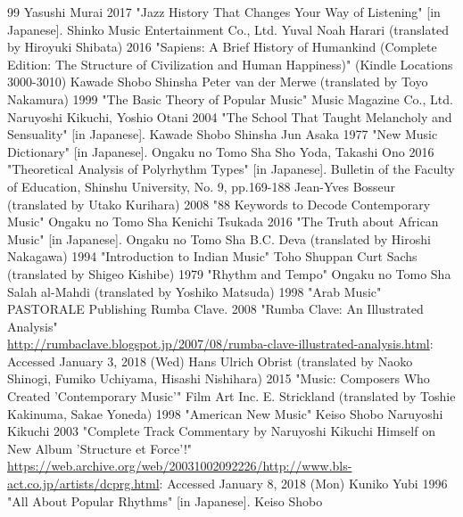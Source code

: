 
\begin{thebibliography}{99}
 Yasushi Murai 2017 "Jazz History That Changes Your Way of Listening" [in Japanese]. Shinko Music Entertainment Co., Ltd.
 Yuval Noah Harari (translated by Hiroyuki Shibata) 2016 "Sapiens: A Brief History of Humankind (Complete Edition: The Structure of Civilization and Human Happiness)" (Kindle Locations 3000-3010) Kawade Shobo Shinsha
 Peter van der Merwe (translated by Toyo Nakamura) 1999 "The Basic Theory of Popular Music" Music Magazine Co., Ltd.
 Naruyoshi Kikuchi, Yoshio Otani 2004 "The School That Taught Melancholy and Sensuality" [in Japanese]. Kawade Shobo Shinsha
 Jun Asaka 1977 "New Music Dictionary" [in Japanese]. Ongaku no Tomo Sha
 Sho Yoda, Takashi Ono 2016 "Theoretical Analysis of Polyrhythm Types" [in Japanese]. Bulletin of the Faculty of Education, Shinshu University, No. 9, pp.169-188
 Jean-Yves Bosseur (translated by Utako Kurihara) 2008 "88 Keywords to Decode Contemporary Music" Ongaku no Tomo Sha
 Kenichi Tsukada 2016 "The Truth about African Music" [in Japanese]. Ongaku no Tomo Sha
 B.C. Deva (translated by Hiroshi Nakagawa) 1994 "Introduction to Indian Music" Toho Shuppan
 Curt Sachs (translated by Shigeo Kishibe) 1979 "Rhythm and Tempo" Ongaku no Tomo Sha
 Salah al-Mahdi (translated by Yoshiko Matsuda) 1998 "Arab Music" PASTORALE Publishing
 Rumba Clave. 2008 "Rumba Clave: An Illustrated Analysis"\\
\url{http://rumbaclave.blogspot.jp/2007/08/rumba-clave-illustrated-analysis.html}: Accessed January 3, 2018 (Wed)
 Hans Ulrich Obrist (translated by Naoko Shinogi, Fumiko Uchiyama, Hisashi Nishihara) 2015 "Music: Composers Who Created 'Contemporary Music'" Film Art Inc.
 E. Strickland (translated by Toshie Kakinuma, Sakae Yoneda) 1998 "American New Music" Keiso Shobo
 Naruyoshi Kikuchi 2003 "Complete Track Commentary by Naruyoshi Kikuchi Himself on New Album 'Structure et Force'!" \url{https://web.archive.org/web/20031002092226/http://www.bls-act.co.jp/artists/dcprg.html}: Accessed January 8, 2018 (Mon)
 Kuniko Yubi 1996 "All About Popular Rhythms" [in Japanese]. Keiso Shobo
\end{thebibliography}

